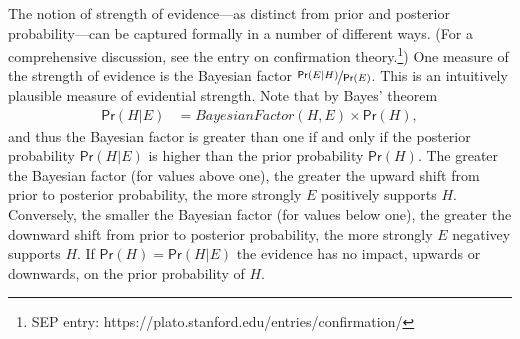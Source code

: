 \documentclass{article}
\newcommand{\pr}{\mathsf{Pr}}
\begin{document}
The notion of  strength of evidence---as distinct from prior and posterior probability---can be captured formally  in a number of different ways.
(For a comprehensive discussion, see the entry on confirmation theory.\footnote{SEP entry: https://plato.stanford.edu/entries/confirmation/})
One measure of the strength of evidence is the Bayesian factor $\nicefrac{\pr(E \vert H)}{\pr(E)}$. %
This is an intuitively plausible measure of evidential strength. Note that by Bayes' theorem
%
%
\begin{align*}\pr(H \vert E) & = \textit{BayesianFactor}(H, E) \times \pr(H),\end{align*}
%
and thus the Bayesian factor is greater than one if and only if
the posterior probability $\pr(H \vert E)$ is higher than the prior probability $\pr(H)$. %
The greater the Bayesian factor (for values above one), the greater the upward shift from prior to posterior probability, the more strongly $E$ positively supports $H$.
Conversely, the smaller the Bayesian factor (for values below one), the greater the downward shift from prior to posterior probability, the more strongly $E$ negativey supports $H$. If $\pr(H)=\pr(H\vert E)$ the evidence  has no impact, upwards or downwards, on the prior probability of $H$. %

\end{document}
